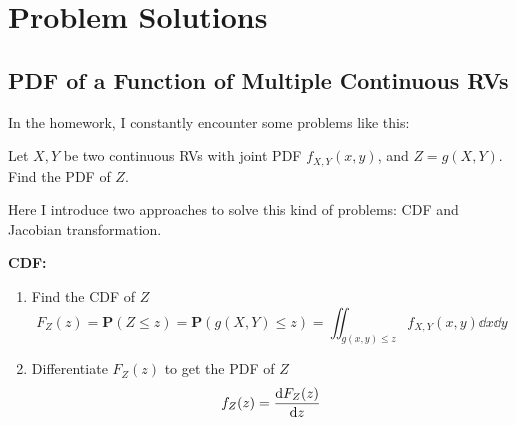 \chapter{Problem Solutions}


\section{PDF of a Function of Multiple Continuous RVs}

In the homework, I constantly encounter some problems like this:
\begin{example}
    Let $X, Y$ be two continuous RVs with joint PDF $f_{X, Y}(x, y)$, and $Z = g(X, Y)$. Find the PDF of $Z$.
\end{example}

Here I introduce two approaches to solve this kind of problems: CDF and Jacobian transformation.
\begin{solution}
    \textbf{CDF:}
    \begin{enumerate}
        \item Find the CDF of $Z$
            \begin{equation}
                F_{Z}(z) = \mathbf{P}(Z \leq z) = \mathbf{P}(g(X, Y) \leq z) = \iint_{g(x, y) \leq z} f_{X, Y}(x, y) \dd{x} \dd{y}
            \end{equation}
        \item Differentiate $F_{Z}(z)$ to get the PDF of $Z$
            \begin{equation}
                f_{Z}(z) = \dv{F_{Z}(z)}{z}
            \end{equation}
    \end{enumerate}
\end{solution}
